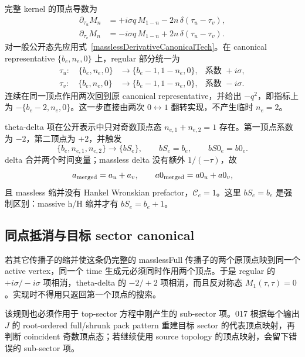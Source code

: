 ﻿\documentclass[a4paper,11pt]{article}
\begin{document}
完整 kernel 的顶点导数为
\begin{align}
 \partial_{\tau_u}M_n
 &=+i\sigma q\,M_{1-n}
   -2n\,\delta(\tau_u-\tau_v),\\
 \partial_{\tau_v}M_n
 &=-i\sigma q\,M_{1-n}
   +2n\,\delta(\tau_u-\tau_v).
 \label{masslessTimeRulesTech}
\end{align}
对一般公开态先应用式~\eqref{masslessDerivativeCanonicalTech}。在 canonical representative $\{b_e,n_e,0\}$ 上，regular 部分统一为
\begin{align}
 \tau_u:\quad
 \{b_e,n_e,0\}&\longrightarrow\{b_e-1,1-n_e,0\},
 &\text{系数 }+i\sigma,\\
 \tau_v:\quad
 \{b_e,n_e,0\}&\longrightarrow\{b_e-1,1-n_e,0\},
 &\text{系数 }-i\sigma.
\end{align}
连续在同一顶点作用两次回到原 canonical representative，并给出 $-q^2$，即指标上为 $-\{b_e-2,n_e,0\}$。这一步直接由两次 $0\leftrightarrow1$ 翻转实现，不产生临时 $n_e=2$。

theta-delta 项在公开表示中只对奇数顶点态 $n_{e,1}+n_{e,2}=1$ 存在。第一顶点系数为 $-2$，第二顶点为 $+2$，并触发
\begin{equation}
 \{b_e,n_{e,1},n_{e,2}\}\longrightarrow\{bS_e\},\qquad
 bS_e=b_e,\qquad bS0_e=b0_e.
 \label{masslessShrinkTech}
\end{equation}
 delta 合并两个时间变量；massless delta 没有额外 $1/(-\tau)$，故
\begin{equation}
 a_{\rm merged}=a_u+a_v,\qquad
 a0_{\rm merged}=a0_u+a0_v,
\end{equation}
且 massless 缩并没有 Hankel Wronskian prefactor，$\mathcal C_e=1$。这里 $bS_e=b_e$ 是强制区别：massive h/H 缩并才有 $bS_e=b_e+1$。

\subsection{同点抵消与目标 sector canonical}

若其它传播子的缩并使这条仍完整的 masslessFull 传播子的两个原顶点映到同一个 active vertex，同一个 time 生成元必须同时作用两个顶点。于是 regular 的 $+i\sigma/-i\sigma$ 项相消，theta-delta 的 $-2/+2$ 项相消，而且反对称态 $M_1(\tau,\tau)=0$。实现时不得用只返回第一个顶点的搜索。

该规则也必须作用于 top-sector 方程中刚产生的 sub-sector 项。017 根据每个输出 $J$ 的 root-ordered full/shrunk pack pattern 重建目标 sector 的代表顶点映射，再判断 coincident 奇数顶点态；若继续使用 source topology 的顶点映射，会留下错误的 sub-sector 项。
\end{document}

